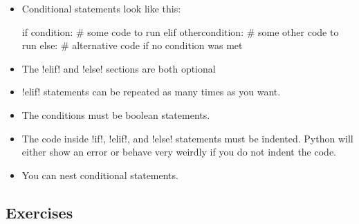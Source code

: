 \documentclass[11pt]{cselabheader}
\begin{document}
\begin{itemize}
  \item Conditional statements look like this:

    \begin{python3code}
if condition:
    # some code to run
elif othercondition:
    # some other code to run
else:
    # alternative code if no condition was met
    \end{python3code}

  \item The \pythoninline!elif! and \pythoninline!else! sections are both optional
  \item \pythoninline!elif! statements can be repeated as many times as you want.
  \item The conditions must be boolean statements.
  \item The code inside \pythoninline!if!, \pythoninline!elif!, and \pythoninline!else!
    statements must be indented. Python will either show an error or behave very
    weirdly if you do not indent the code.
  \item You can nest conditional statements.
\end{itemize}

\subsection{Exercises}
\label{subsec:ifex}
\end{document}
